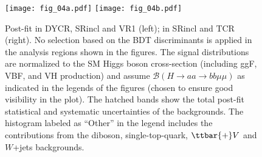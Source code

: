 \documentclass[cernpreprint, backref=false, texlive=2020, UKenglish, dvipsnames, block=none, texmf]{atlasdoc}
\begin{document}
 
\begin{table}[htb]
\caption{Total and individual background yields in six
representative $m_{\mu\mu}$ bins of the signal region after the BDT selection is applied. The yields
are the post-fit values as determined by the background validation fit.
The uncertainties shown include all systematic and statistical uncertainties. As the diboson, single top quark, $\ttbar V$, and $W$+jets contributions are very small, they are summed in the table under "Other".}
\begin{center}
\end{center}
\label{SRyields}
\end{table}
 
 
\begin{figure}
\centering
\texttt{[image: fig\_04a.pdf]}
\texttt{[image: fig\_04b.pdf]}
\caption{Post-fit \KLMbbmm in DYCR, SRincl and VR1 (left); \met in SRincl and TCR (right). No selection based on the BDT discriminants is applied in the analysis regions shown in the figures. The signal distributions are normalized to the SM Higgs boson cross-section (including ggF, VBF, and VH production) and assume
$\mathcal{B}(H \rightarrow aa \rightarrow bb\mu\mu)$ as indicated in the legends of the figures (chosen to ensure good visibility in the plot). The hatched bands show the total post-fit statistical and systematic uncertainties of the backgrounds. The histogram labeled as ``Other'' in the legend includes the contributions from the diboson, single-top-quark, $\ttbar{+}V$ and $W$+jets backgrounds.}
\label{SRvalidation1}
\end{figure}
 
\end{document}

